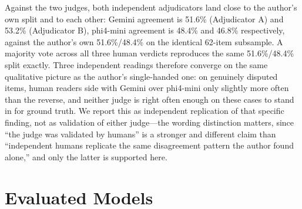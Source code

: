 Against the two judges, both independent adjudicators land close to the author's own split and to
each other: Gemini agreement is 51.6\% (Adjudicator A) and 53.2\% (Adjudicator B), phi4-mini
agreement is 48.4\% and 46.8\% respectively, against the author's own 51.6\%/48.4\% on the identical
62-item subsample.
A majority vote across all three human verdicts reproduces the same 51.6\%/48.4\% split exactly.
Three independent readings therefore converge on the same qualitative picture as the author's
single-handed one: on genuinely disputed items, human readers side with Gemini over phi4-mini only
slightly more often than the reverse, and neither judge is right often enough on these cases to
stand in for ground truth. We report this as independent replication of that specific finding, not
as validation of either judge---the wording distinction matters, since ``the judge was validated by
humans'' is a stronger and different claim than ``independent humans replicate the same disagreement
pattern the author found alone,'' and only the latter is supported here.

\section{Evaluated Models}
\label{app:models}

